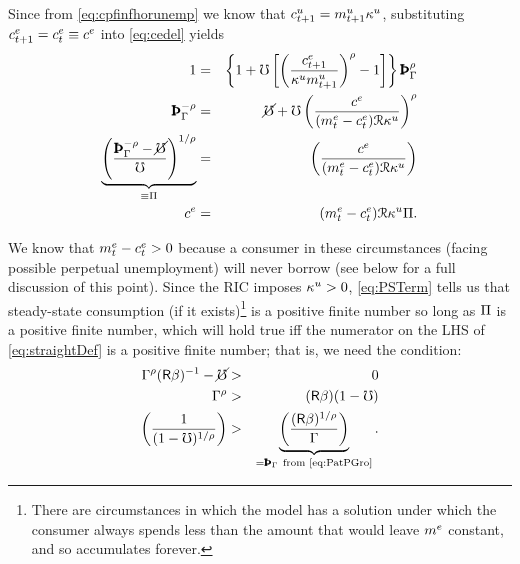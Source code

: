 \documentclass{handout}
\begin{document}



Since from \eqref{eq:cpfinfhorunemp} we know that $c^{u}_{t+1} = {m}^{u}_{t+1} \kappa^{u}$, substituting $c^{e}_{t+1}=c^{e}_{t} \equiv c^{e}$ into \eqref{eq:cedel} yields 
\begin{eqnarray}
         1 & = & \left\{1+\urate\left[\left(\frac{\cRatE_{t+1}}{\MPCU \mRat_{t+1}^{u}}\right)^{\CRRA}-1\right]\right\} \PatPGro^{\CRRA}
\\ \PatPGro^{-\CRRA} & = &  \erate+\urate\left(\frac{\cRatE_{\tSS}}{(\mRatE_{\tNow}-\cRatE_{\tNow})\Rnorm\MPCU }\right)^{\CRRA}
\\ \underbrace{\left(\frac{\PatPGro^{-\CRRA}-\erate}{\urate}\right)^{1/\CRRA}}_{\equiv \straight} & = &   \left(\frac{\cRatE_{\tSS}}{(\mRatE_{\tNow}-\cRatE_{\tNow})\Rnorm\MPCU}\right) \label{eq:straightDef}
\\      \cRatE_{\tSS} & = & (\mRatE_{t}-\cRatE_{t})\Rnorm\MPCU \straight \label{eq:PSTerm}.
\end{eqnarray}

We know that $m^{e}_{t}-c^{e}_{t} > 0$ because a consumer in these
circumstances (facing possible perpetual unemployment) will never
borrow (see below for a full discussion of this point). Since
the RIC imposes $\kappa^{u}>0$, \eqref{eq:PSTerm} tells
us that steady-state consumption (if it exists)\footnote{There are circumstances in which the model has a solution under which the consumer always spends less than the amount that would leave $m^{e}$ constant, and so accumulates forever.} is a positive finite number so long
as $\Pi$ is a positive finite number, which will hold true iff the numerator on the LHS of
\eqref{eq:straightDef} is a positive finite number; that is, we need the
condition:
\begin{eqnarray}
        \PGro^{\CRRA}(\Rfree\Discount)^{-1}-\erate & > & 0  \\
       \PGro^{\CRRA} & > & (\Rfree \Discount)(1-\urate)
\\     \left(\frac{1}{(1-\urate)^{1/\CRRA}}\right) & > & \underbrace{\left(\frac{(\Rfree \Discount)^{1/\CRRA}}{\PGro}\right)}_{=\PatPGro~\text{from \eqref{eq:PatPGro}}}  \label{eq:GICTBS}.
\end{eqnarray}
\end{document}
